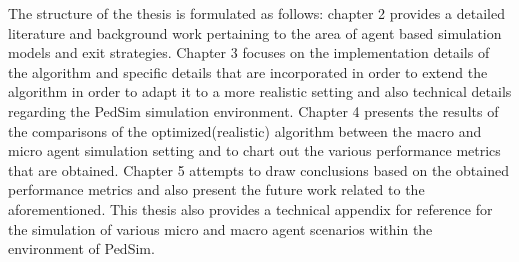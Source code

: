 The structure of the thesis is formulated as follows: chapter 2 provides a detailed literature and background work pertaining to the area of agent based simulation models and exit strategies. Chapter 3 focuses on the implementation details of the algorithm and specific details that are incorporated in order to extend the algorithm in order to adapt it to a more realistic setting and also technical details regarding the PedSim simulation environment. Chapter 4 presents the results of the comparisons of the optimized(realistic) algorithm between the macro and micro agent simulation setting and to chart out the various performance metrics that are obtained. Chapter 5 attempts to draw conclusions based on the obtained performance metrics and also present the future work related to the aforementioned. This thesis also provides a technical appendix for reference for the simulation of various micro and macro agent scenarios within the environment of PedSim.